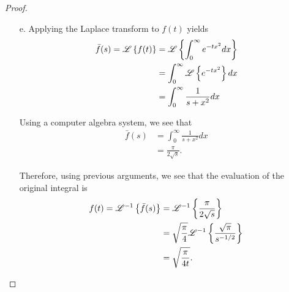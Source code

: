 \begin{proof}
\begin{enumerate}
    \item[e.] Applying the Laplace transform to $f(t)$ yields
      \begin{align*}
        \bar{f}(s) = \mathscr{L}\left\{ {f(t)} \right\}
        &= \mathscr{L}\left\{ {\int_0^\infty e^{-tx^2} dx} \right\} \\
        &= \int_0^\infty \mathscr{L}\left\{ {e^{-tx^2}} \right\} dx \\
        &= \int_0^\infty \frac{1}{s+x^2} dx \\
      \end{align*}

      Using a computer algebra system, we see that
      \begin{align*}
        \bar{f}(s) &= \int_0^\infty \frac{1}{s+x^2} dx \\
        &= \frac{\pi}{2\sqrt{s}}.
      \end{align*}

      Therefore, using previous arguments, we see that the evaluation of the original integral is
      \begin{align*}
        f(t) = \mathscr{L}^{-1}\left\{ {\bar{f}(s)} \right\} &= \mathscr{L}^{-1}\left\{ {\frac{\pi}{2\sqrt{s}}} \right\} \\
        &= \sqrt{\frac{\pi}{4}}\mathscr{L}^{-1}\left\{ {\frac{\sqrt{\pi}}{s^{-1/2}}} \right\} \\
        &= \sqrt{\frac{\pi}{4t}}.
      \end{align*}
  \end{enumerate}
\end{proof}
\newpage
